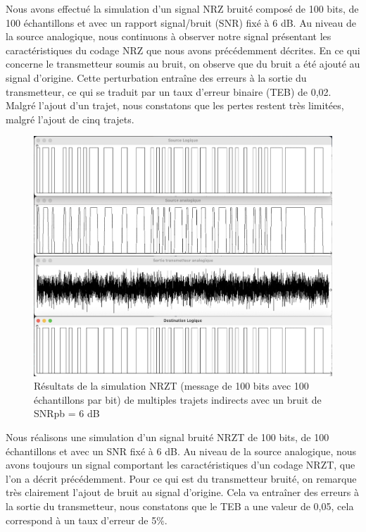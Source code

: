 Nous avons effectué la simulation d'un signal NRZ bruité composé de 100 bits, de 100 échantillons et avec un rapport signal/bruit (SNR) fixé à 6 dB. Au niveau de la source analogique, nous continuons à observer notre signal présentant les caractéristiques du codage NRZ que nous avons précédemment décrites. En ce qui concerne le transmetteur soumis au bruit, on observe que du bruit a été ajouté au signal d'origine. Cette perturbation entraîne des erreurs à la sortie du transmetteur, ce qui se traduit par un taux d'erreur binaire (TEB) de 0,02. Malgré l'ajout d'un trajet, nous constatons que les pertes restent très limitées, malgré l'ajout de cinq trajets.


\begin{figure}[H]
    \centering
    \includegraphics[width=\textwidth]{img/etape4b_ti_multiples_et_bruit_6_NRZT.png}
    \caption{Résultats de la simulation NRZT (message de 100 bits avec 100 échantillons par bit) de multiples trajets indirects avec un bruit de SNRpb = 6 dB}
    \label{fig:etape4b_ti_multiples_et_bruit_6_NRZT}
\end{figure}

Nous réalisons une simulation d'un signal bruité NRZT de 100 bits, de 100 échantillons et avec un SNR fixé à 6 dB. Au niveau de la source analogique, nous avons toujours un signal comportant les caractéristiques d'un codage NRZT, que l'on a décrit précédemment. Pour ce qui est du transmetteur bruité, on remarque très clairement l'ajout de bruit au signal d'origine. Cela va entraîner des erreurs à la sortie du transmetteur, nous constatons que le TEB a une valeur de 0,05, cela correspond à un taux d'erreur de 5$\%$. 




